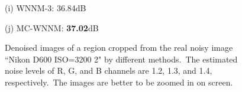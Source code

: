 \documentclass[10pt,onecolumn,letterpaper]{article}
\begin{document}
\begin{figure}[!htbp]
{\begin{minipage}[t]{0.24\textwidth}
{\footnotesize (i) WNNM-3: 36.84dB}
\end{minipage}
\begin{minipage}[t]{0.24\textwidth}
\centering
{}
{\footnotesize (j) MC-WNNM: \textbf{37.02}dB}
\end{minipage}
}
\caption{Denoised images of a region cropped from the real noisy image ``Nikon D600 ISO=3200 2" \cite{crosschannel2016} by different methods.\ The estimated noise levels of R, G, and B channels are 1.2, 1.3, and 1.4, respectively.\ The images are better to be zoomed in on screen.}
\label{f12}
\end{figure}
\end{document}
